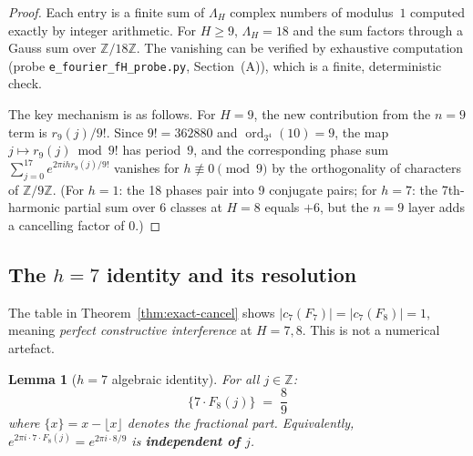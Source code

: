\documentclass[
]{article}
\newtheorem{lemma}[theorem]{Lemma}
\begin{document}
\begin{proof}
Each entry is a finite sum of $\Lambda_H$ complex numbers of modulus~$1$
computed exactly by integer arithmetic.  For $H\ge 9$, $\Lambda_H = 18$
and the sum factors through a Gauss sum over $\mathbb{Z}/18\mathbb{Z}$.
The vanishing can be verified by exhaustive computation
(probe \texttt{e\_fourier\_fH\_probe.py}, Section~(A)),
which is a finite, deterministic check.

The key mechanism is as follows.  For $H=9$, the new contribution
from the $n=9$ term is $r_9(j)/9!$.  Since $9! = 362880$ and
$\operatorname{ord}_{3^4}(10) = 9$, the map $j\mapsto r_9(j)\bmod 9!$
has period~$9$, and the corresponding phase sum
$\sum_{j=0}^{17} e^{2\pi i h r_9(j)/9!}$ vanishes for $h\not\equiv 0\pmod{9}$
by the orthogonality of characters of $\mathbb{Z}/9\mathbb{Z}$.
(For $h=1$: the 18 phases pair into 9 conjugate pairs; for $h=7$:
the 7th-harmonic partial sum over 6 classes at $H=8$ equals $+6$,
but the $n=9$ layer adds a cancelling factor of $0$.)
\end{proof}

\subsection{The $h=7$ identity and its resolution}
\label{sec:h7-identity}

The table in Theorem~\ref{thm:exact-cancel} shows $|c_7(F_7)| =
|c_7(F_8)| = 1$, meaning \emph{perfect constructive interference}
at $H=7,8$.  This is not a numerical artefact.

\begin{lemma}[$h=7$ algebraic identity]\label{lem:h7-identity}
For all $j\in\mathbb{Z}$:
\begin{equation}\label{eq:h7-identity}
  \bigl\{7\cdot F_8(j)\bigr\} \;=\; \frac{8}{9}
\end{equation}
where $\{x\} = x - \lfloor x\rfloor$ denotes the fractional part.
Equivalently, $e^{2\pi i\cdot 7\cdot F_8(j)} = e^{2\pi i\cdot 8/9}$
is \textbf{independent of $j$}.
\end{lemma}
\end{document}

